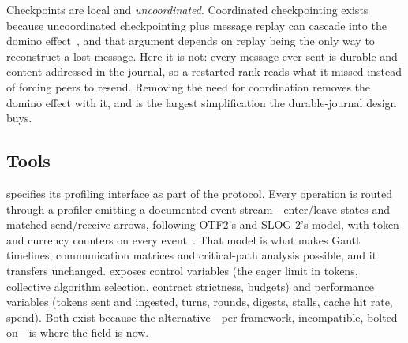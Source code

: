 Checkpoints are local and \emph{uncoordinated}. Coordinated checkpointing
exists because uncoordinated checkpointing plus message replay can cascade
into the domino effect~\cite{Chandy1985,Elnozahy2002}, and that argument
depends on replay being the only way to reconstruct a lost message. Here it
is not: every message ever sent is durable and content-addressed in the
journal, so a restarted rank reads what it missed instead of forcing peers
to resend. Removing the need for coordination removes the domino effect with
it, and is the largest simplification the durable-journal design buys.

\subsection{Tools}

\ampi{} specifies its profiling interface as part of the protocol. Every
operation is routed through a profiler emitting a documented event
stream---enter/leave states and matched send/receive arrows, following
OTF2's and SLOG-2's model, with token and currency counters on every
event~\cite{knupfer2012scorep}. That model is what makes Gantt timelines,
communication matrices and critical-path analysis possible, and it transfers
unchanged.  exposes control variables (the eager limit in tokens,
collective algorithm selection, contract strictness, budgets) and
performance variables (tokens sent and ingested, turns, rounds, digests,
stalls, cache hit rate, spend). Both exist because the alternative---per
framework, incompatible, bolted on---is where the field is now.
